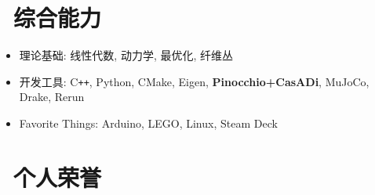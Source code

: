 \documentclass{resume}
\begin{document}
\section{\faCogs\ 综合能力}
\begin{itemize}[parsep=0.5ex]
  \item 理论基础: 线性代数, 动力学, 最优化, 纤维丛%
  \item 开发工具: C\texttt{++}, Python, CMake, Eigen, \textbf{Pinocchio+CasADi}, {MuJoCo}, {Drake}, Rerun
  \item Favorite Things: Arduino, LEGO, Linux, Steam Deck
\end{itemize}

\section{\faHeartO\ 个人荣誉}
\end{document}
